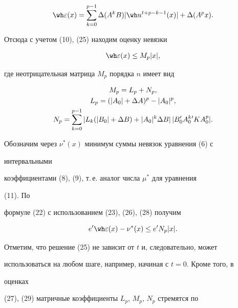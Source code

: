 \begin{equation} 


\wh\varepsilon(x)=\sum^{p-1}_{k=0}\Delta(A^k B) 


|\wh u^{t+p-k-1}(x)|+\Delta(A^p x). 


\end{equation} 


Отсюда с учетом (10), (25) находим оценку невязки 


\begin{equation} 


\wh\varepsilon(x)\le M_p|x|, 


\end{equation} 


где неотрицательная матрица $M_p$ порядка $n$ имеет вид 


\begin{gather} 


M_p=L_p+N_p,\\ 


L_p=(|A_0|+\Delta A)^p-|A_0|^p,\notag\\ 


N_p=\sum^{p-1}_{k=0}|L_k(|B_0|+\Delta B)+|A_0|^k 


\Delta B|\,|B'_0A^k_0{}' K A^p_0|.\notag 


\end{gather} 


 


Обозначим через $\nu^*(x)$ минимум суммы невязок уравнения (6) с 


интервальными 


коэффициентами (8), (9), т.\,е. аналог числа $\mu^*$ для уравнения 


(11). По 


формуле (22) с использованием (23), (26), (28) получим 


\begin{equation} 


e'\wh\varepsilon(x)-\nu^*(x)\le e' N_p|x|. 


\end{equation} 


 


Отметим, что решение (25) не зависит от $t$ и, следовательно, может 


использоваться на любом шаге, например, начиная с $t=0$. Кроме того, в 


оценках 


(27), (29) матричные коэффициенты $L_p$, $M_p$, $N_p$ стремятся по 



